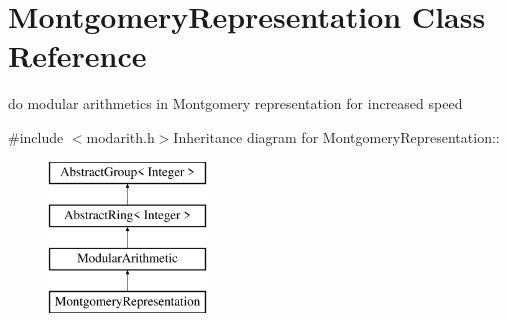 \hypertarget{class_montgomery_representation}{
\section{MontgomeryRepresentation Class Reference}
\label{class_montgomery_representation}
}


do modular arithmetics in Montgomery representation for increased speed  


{\ttfamily \#include $<$modarith.h$>$}Inheritance diagram for MontgomeryRepresentation::\begin{figure}[H]
\begin{center}
\leavevmode
\includegraphics[height=4cm]{class_montgomery_representation}
\end{center}
\end{figure}
